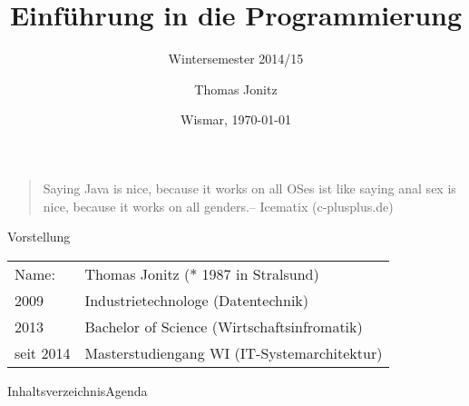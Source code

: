 \documentclass{hswbeamer}
\title[EiP]{Einführung in die Programmierung}
\subtitle[WS 2014/15]{Wintersemester 2014/15}
\author{Thomas Jonitz}
\date{Wismar, \today}
\begin{document}
\begin{frame}
    \begin{quote}
        \glqq Saying Java is nice, because it works on all OSes ist like saying anal sex is nice, because it works on all genders.\grqq -- Icematix (c-plusplus.de)
    \end{quote}
\end{frame}


\begin{frame}{Vorstellung}
    \begin{tabular}{ll}
    Name:&Thomas Jonitz ($\ast$ 1987 in Stralsund)\\
    2009&Industrietechnologe (Datentechnik)\\
    2013&Bachelor of Science (Wirtschaftsinfromatik)\\
    seit 2014&Masterstudiengang WI (IT-Systemarchitektur)
    \end{tabular}
\end{frame}

\begin{frame}
    \maketitle
\end{frame}

\begin{frame}{Inhaltsverzeichnis}{Agenda}
    \tableofcontents
\end{frame}
\end{document}
